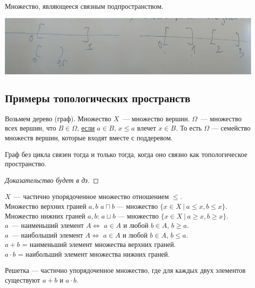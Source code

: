 \begin{definition}

    Множество, являющееся связным подпространством.
\end{definition}

\begin{center}
    \includegraphics[scale=0.6]{img/topology_connectivy}
\end{center}

\subsection{Примеры топологических пространств}
Возьмем дерево (граф). Множество $X$~--- множество вершин. $\Omega$~--- множество всех вершин, что
$B \in \Omega$, \underline{если} $a \in B$, $x \leqslant a$ влечет $x \in B$.
То есть $\Omega$ --- семейство множеств вершин, которые входят вместе с поддеревом.

\begin{theorem}
    Граф без цикла связен тогда и только тогда, когда оно связно как топологическое пространство.
\end{theorem}
\begin{proof}[Доказательство будет в дз]
\end{proof}

\begin{definition}[Решетки]
    $X$~--- частично упорядоченное множество отношением $\leqslant$.\\
    Множество верхних граней $a, b$ $a \sqcap b$ --- множество $\{ x \in X ~|~ a \leqslant x, b \leqslant x\}$.\\
    Множество нижних граней $a, b$: $a \sqcup b$ --- множество $\{ x \in X ~|~ a \geqslant x, b \geqslant x\}$.\\
    $a$~--- наименьший элемент $A \iff$ $a \in A$ и любой $b \in A$, $b \geqslant a$.\\
    $a$~--- наибольший элемент $A \iff$ $a \in A$ и любой $b \in A$, $b \leqslant a$.\\
    $a+b$ = наименьший элемент множества верхних граней.\\
    $a \cdot b$ = наибольший элемент множества нижних граней.

    Решетка --- частично упорядоченное множество, где для каждых двух элементов существуют $a+b$ и $a \cdot b$.
\end{definition}

